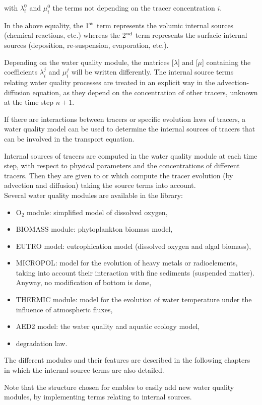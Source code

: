 with $\lambda_i^0$ and $\mu_i^0$ the terms not depending on the tracer concentration $i$.

In the above equality, the 1$^{\rm{st}}$ term represents the volumic internal sources
(chemical reactions, etc.) whereas the 2$^{\rm{nd}}$ term represents the surfacic internal sources
(deposition, re-suspension, evaporation, etc.).

Depending on the water quality module, the matrices [$\lambda$] and [$\mu$]
containing the coefficients $\lambda_i^j$ and $\mu_i^j$ will be written differently.
The internal source terms relating water quality processes are treated
in an explicit way in the advection-diffusion equation,
as they depend on the concentration of other tracers,
unknown at the time step $n+1$.

If there are interactions between tracers or specific evolution laws of tracers,
a water quality model can be used to determine the internal sources of tracers
that can be involved in the transport equation.

Internal sources of tracers are computed in the water quality module \waqtel
at each time step, with respect to physical parameters and
the concentrations of different tracers.
Then they are given to  or  which compute
the tracer evolution (by advection and diffusion) taking the
source terms into account.\\

Several water quality modules are available in the \waqtel library:
\begin{itemize}
  \item O$_2$ module: simplified model of dissolved oxygen,
  \item BIOMASS module: phytoplankton biomass model,
  \item EUTRO model: eutrophication model (dissolved oxygen and algal biomass),
  \item MICROPOL: model for the evolution of heavy metals or radioelements,
    taking into account their interaction with fine sediments (suspended matter).
    Anyway, no modification of bottom is done,
  \item THERMIC module: model for the evolution of water temperature under the influence
    of atmospheric fluxes,
  \item AED2 model: the water quality and aquatic ecology model,
  \item degradation law.
\end{itemize}

The different modules and their features are described in the following chapters
in which the internal source terms are also detailed.

Note that the structure chosen for \waqtel enables to easily add new
water quality modules, by implementing terms relating to internal sources.
